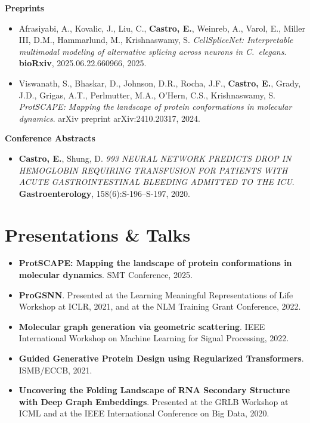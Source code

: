 \documentclass[letterpaper,11pt]{article}
\begin{document}
{\vspace{4pt}
\textbf{Preprints}
\begin{itemize}[leftmargin=0.18in, itemsep=5pt, topsep=2pt]
  \item Afrasiyabi, A., Kovalic, J., Liu, C., \textbf{Castro, E.}, Weinreb, A., Varol, E., Miller III, D.M., Hammarlund, M., Krishnaswamy, S.
  \textit{CellSpliceNet: Interpretable multimodal modeling of alternative splicing across neurons in C.\ elegans}.
  \textbf{bioRxiv}, 2025.06.22.660966, 2025.

  \item Viswanath, S., Bhaskar, D., Johnson, D.R., Rocha, J.F., \textbf{Castro, E.}, Grady, J.D., Grigas, A.T., Perlmutter, M.A., O'Hern, C.S., Krishnaswamy, S.
  \textit{ProtSCAPE: Mapping the landscape of protein conformations in molecular dynamics}.
  arXiv preprint arXiv:2410.20317, 2024.
\end{itemize}

\vspace{4pt}
\textbf{Conference Abstracts}
\begin{itemize}[leftmargin=0.18in, itemsep=5pt, topsep=2pt]
  \item[$\dagger$] \textbf{Castro, E.}, Shung, D.
  \textit{993 NEURAL NETWORK PREDICTS DROP IN HEMOGLOBIN REQUIRING TRANSFUSION FOR PATIENTS WITH ACUTE GASTROINTESTINAL BLEEDING ADMITTED TO THE ICU}.
  \textbf{Gastroenterology}, 158(6):S-196--S-197, 2020.
\end{itemize}
}

\section{Presentations \& Talks}
{\small
\begin{itemize}[leftmargin=0.18in, itemsep=4pt, topsep=2pt]
  \item \textbf{ProtSCAPE: Mapping the landscape of protein conformations in molecular dynamics}. SMT Conference, 2025.
  \item \textbf{ProGSNN}. Presented at the Learning Meaningful Representations of Life Workshop at ICLR, 2021, and at the NLM Training Grant Conference, 2022.
  \item \textbf{Molecular graph generation via geometric scattering}. IEEE International Workshop on Machine Learning for Signal Processing, 2022.
  \item \textbf{Guided Generative Protein Design using Regularized Transformers}. ISMB/ECCB, 2021.
  \item \textbf{Uncovering the Folding Landscape of RNA Secondary Structure with Deep Graph Embeddings}. Presented at the GRLB Workshop at ICML and at the IEEE International Conference on Big Data, 2020.
\end{itemize}
}
\end{document}
